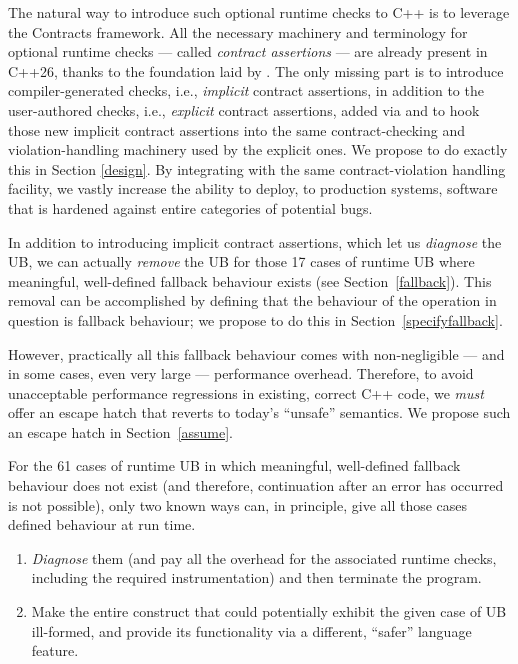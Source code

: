 The natural way to introduce such optional runtime checks to C++ is to leverage the Contracts framework. All the necessary machinery and terminology for optional runtime checks --- called \emph{contract assertions} --- are already present in C++26, thanks to the foundation laid by \cite{P2900R14}. The only missing part is to introduce compiler-generated checks, i.e., \emph{implicit} contract assertions, in addition to the user-authored checks, i.e., \emph{explicit} contract assertions,  added via \cite{P2900R14} and to hook those new implicit contract assertions into the same contract-checking and violation-handling machinery used by the explicit ones. We propose to do exactly this in Section \ref{design}. By integrating with the same contract-violation handling facility, we vastly increase the ability to deploy, to production systems, software that is hardened against entire categories of potential bugs.

In addition to introducing implicit contract assertions, which let us \emph{diagnose} the UB, we can actually \emph{remove} the UB for those 17 cases of runtime UB where meaningful, well-defined fallback behaviour exists (see Section~\ref{fallback}). This removal can be accomplished by defining that the behaviour of the operation in question is fallback behaviour; we propose to do this in Section~\ref{specifyfallback}.

However, practically all this fallback behaviour comes with non-negligible --- and in some cases, even very large --- performance overhead. Therefore, to avoid unacceptable performance regressions in existing, correct C++ code, we \emph{must} offer an escape hatch that reverts to today's ``unsafe'' semantics. We propose such an escape hatch in Section~\ref{assume}.

For the 61 cases of runtime UB in which meaningful, well-defined fallback behaviour does not exist (and therefore, continuation after an error has occurred is not possible), only two known ways can, in principle, give all those cases defined behaviour at run time.
\begin{enumerate}
\item \emph{Diagnose} them (and pay all the overhead for the associated runtime checks, including the required instrumentation) and then terminate the program.
\item Make the entire construct that could potentially exhibit the given case of UB ill-formed, and provide its functionality via a different, ``safer'' language feature.
\end{enumerate}

